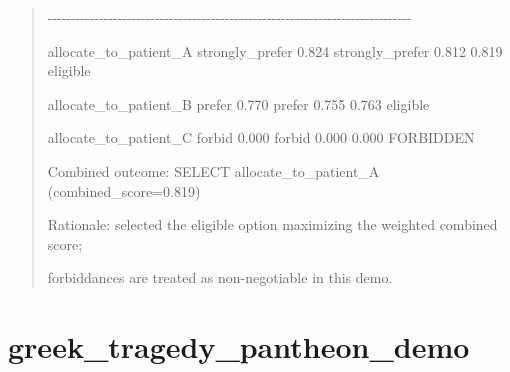 \documentclass[12pt]{article}
\theoremstyle{plain}
\theoremstyle{definition}
\theoremstyle{remark}
\begin{document}
\begin{quote}
-\/-\/-\/-\/-\/-\/-\/-\/-\/-\/-\/-\/-\/-\/-\/-\/-\/-\/-\/-\/-\/-\/-\/-\/-\/-\/-\/-\/-\/-\/-\/-\/-\/-\/-\/-\/-\/-\/-\/-\/-\/-\/-\/-\/-\/-\/-\/-\/-\/-\/-\/-\/-\/-\/-\/-\/-\/-\/-\/-\/-\/-\/-\/-\/-\/-\/-\/-\/-\/-\/-\/-\/-\/-\/-\/-\/-\/-

allocate\_to\_patient\_A \textbar{} strongly\_prefer 0.824 \textbar{}
strongly\_prefer 0.812 \textbar{} 0.819 \textbar{} eligible

allocate\_to\_patient\_B \textbar{} prefer 0.770 \textbar{} prefer 0.755
\textbar{} 0.763 \textbar{} eligible

allocate\_to\_patient\_C \textbar{} forbid 0.000 \textbar{} forbid 0.000
\textbar{} 0.000 \textbar{} FORBIDDEN

Combined outcome: SELECT
\textquotesingle allocate\_to\_patient\_A\textquotesingle{}
(combined\_score=0.819)

Rationale: selected the eligible option maximizing the weighted combined
score;

forbiddances are treated as non-negotiable in this demo.
\end{quote}

\section{greek\_tragedy\_pantheon\_demo}\label{greek_tragedy_pantheon_demo}
\end{document}
